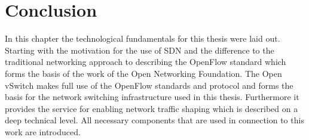 \section{Conclusion}

In this chapter the technological fundamentals for this thesis were laid out. Starting with the motivation for the use of SDN and the difference to the traditional networking approach to describing the OpenFlow standard which forms the basis of the work of the Open Networking Foundation. The Open vSwitch makes full use of the OpenFlow standards and protocol and forms the basis for the network switching infrastructure used in this thesis. Furthermore it provides the service for enabling network traffic shaping which is described on a deep technical level. All necessary components that are used in connection to this work are introduced.